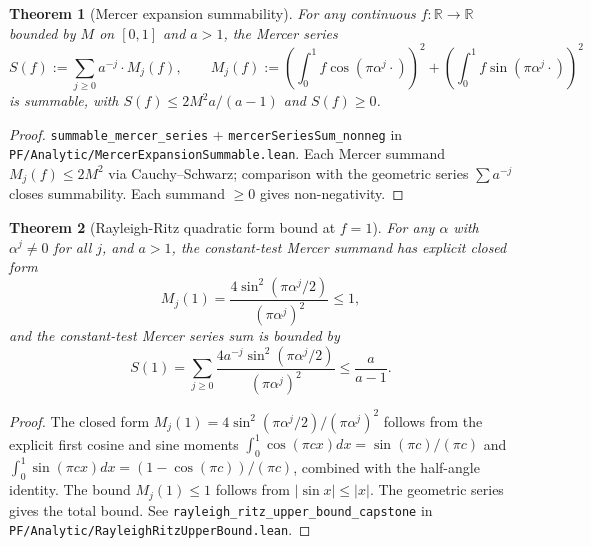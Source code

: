 \documentclass[11pt,a4paper,reqno]{amsart}
\theoremstyle{plain}
\newtheorem{theorem}{Theorem}[section]
\theoremstyle{definition}
\theoremstyle{remark}
\newcommand{\code}[1]{\texttt{#1}}
\begin{document}
\begin{theorem}[Mercer expansion summability]
\label{thm:mercer-summability}
For any continuous $f : \mathbb{R} \to \mathbb{R}$ bounded by $M$ on
$[0, 1]$ and $a > 1$, the Mercer series
\begin{equation}
\label{eq:mercer-series}
S(f) := \sum_{j \ge 0} a^{-j} \cdot M_{j}(f), \qquad
M_{j}(f) := \left(\int_{0}^{1} f \cos(\pi \alpha^{j} \cdot)\right)^{2}
+ \left(\int_{0}^{1} f \sin(\pi \alpha^{j} \cdot)\right)^{2}
\end{equation}
is summable, with $S(f) \le 2 M^{2} a / (a - 1)$ and $S(f) \ge 0$.
\end{theorem}

\begin{proof}
\code{summable\_mercer\_series} +
\code{mercerSeriesSum\_nonneg} in
\code{PF/Analytic/MercerExpansionSummable.lean}. Each Mercer summand
$M_{j}(f) \le 2 M^{2}$ via Cauchy--Schwarz; comparison with the
geometric series $\sum a^{-j}$ closes summability. Each summand $\ge 0$
gives non-negativity.
\end{proof}

\begin{theorem}[Rayleigh-Ritz quadratic form bound at $f = 1$]
\label{thm:rr-upper-bound}
For any $\alpha$ with $\alpha^{j} \ne 0$ for all $j$, and $a > 1$, the
constant-test Mercer summand has explicit closed form
\begin{equation}
\label{eq:mj-one}
M_{j}(1) = \frac{4 \sin^{2}(\pi \alpha^{j} / 2)}{(\pi \alpha^{j})^{2}}
\le 1,
\end{equation}
and the constant-test Mercer series sum is bounded by
\begin{equation}
\label{eq:rr-bound}
S(1) = \sum_{j \ge 0} \frac{4 a^{-j} \sin^{2}(\pi \alpha^{j} / 2)}{(\pi \alpha^{j})^{2}}
\le \frac{a}{a - 1}.
\end{equation}
\end{theorem}

\begin{proof}
The closed form $M_{j}(1) = 4 \sin^{2}(\pi \alpha^{j}/2)/(\pi \alpha^{j})^{2}$
follows from the explicit first cosine and sine moments
$\int_{0}^{1} \cos(\pi c x) dx = \sin(\pi c)/(\pi c)$ and
$\int_{0}^{1} \sin(\pi c x) dx = (1 - \cos(\pi c))/(\pi c)$,
combined with the half-angle identity. The bound $M_{j}(1) \le 1$
follows from $|\sin x| \le |x|$. The geometric series gives the total
bound. See
\code{rayleigh\_ritz\_upper\_bound\_capstone} in
\code{PF/Analytic/RayleighRitzUpperBound.lean}.
\end{proof}
\end{document}
